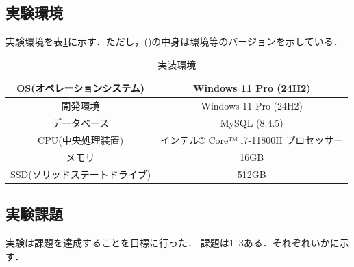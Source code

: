 \documentclass[a4paper,11pt]{ltjsarticle}
\begin{document}
\subsection{実験環境}
実験環境を表\ref{tab:environment}に示す．ただし，()の中身は環境等のバージョンを示している．
\begin{table}[H]
  \caption{実装環境}
  \centering
  \begin{tabular}{|c|c|}
    \hline
    OS(オペレーションシステム)   & Windows 11 Pro (24H2)        \\
    \hline
    開発環境              & Windows 11 Pro (24H2)        \\
    \hline
    データベース            & MySQL (8.4.5)                \\
    \hline
    CPU(中央処理装置)       & インテル® Core™ i7-11800H プロセッサー \\
    \hline
    メモリ               & 16GB                         \\
    \hline
    SSD(ソリッドステートドライブ) & 512GB                        \\
    \hline
  \end{tabular}
  \label{tab:environment}
\end{table}
\subsection{実験課題}
実験は課題を達成することを目標に行った．
課題は1~3ある．それぞれいかに示す．
\end{document}

